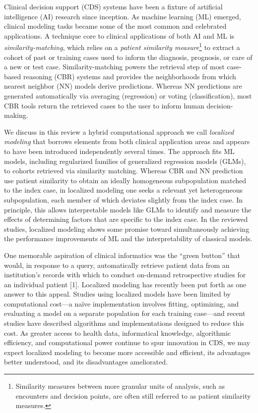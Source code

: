\documentclass[preprint, 3p,
authoryear]{elsarticle} %
\begin{document}
Clinical decision support (CDS) systems have been a fixture of
artificial intelligence (AI) research since inception. As machine
learning (ML) emerged, clinical modeling tasks became some of the most
common and celebrated applications. A technique core to clinical
applications of both AI and ML is \emph{similarity-matching}, which
relies on a \emph{patient similarity measure}\footnote{Similarity
  measures between more granular units of analysis, such as encounters
  and decision points, are often still referred to as patient similarity
  measures.} to extract a cohort of past or training cases used to
inform the diagnosis, prognosis, or care of a new or test case.
Similarity-matching powers the retrieval step of most case-based
reasoning (CBR) systems and provides the neighborhoods from which
nearest neighbor (NN) models derive predictions. Whereas NN predictions
are generated automatically via averaging (regression) or voting
(classification), most CBR tools return the retrieved cases to the user
to inform human decision-making.

We discuss in this review a hybrid computational approach we call
\emph{localized modeling} that borrows elements from both clinical
application areas and appears to have been introduced independently
several times. The approach fits ML models, including regularized
families of generalized regression models (GLMs), to cohorts retrieved
via similarity matching. Whereas CBR and NN prediction use patient
similarity to obtain an ideally homogeneous subpopulation matched to the
index case, in localized modeling one seeks a relevant yet heterogeneous
subpopulation, each member of which deviates slightly from the index
case. In principle, this allows interpretable models like GLMs to
identify and measure the effects of determining factors that are
specific to the index case. In the reviewed studies, localized modeling
shows some promise toward simultaneously achieving the performance
improvements of ML and the interpretability of classical models.

One memorable aspiration of clinical informatics was the ``green
button'' that would, in response to a query, automatically retrieve
patient data from an institution's records with which to conduct
on-demand retrospective studies for an individual patient {[}1{]}.
Localized modeling has recently been put forth as one answer to this
appeal. Studies using localized models have been limited by
computational cost---a naïve implementation involves fitting,
optimizing, and evaluating a model on a separate population for each
training case---and recent studies have described algorithms and
implementations designed to reduce this cost. As greater access to
health data, informatical knowledge, algorithmic efficiency, and
computational power continue to spur innovation in CDS, we may expect
localized modeling to become more accessible and efficient, its
advantages better understood, and its disadvantages ameliorated.
\end{document}
